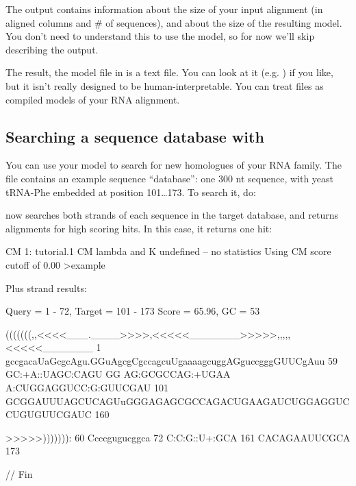 The output  contains information about the size of your
input alignment (in aligned columns and \# of sequences), and about
the size of the resulting model. You don't need to understand this to
use the model, so for now we'll skip describing the output. 

The result, the model file in  is a text file. You can
look at it (e.g. ) if you like, but it isn't really
designed to be human-interpretable. You can treat  files as
compiled models of your RNA alignment.

\newpage
\subsection{Searching a sequence database with }

You can use your model to search for new homologues of your RNA
family. The file  contains an example sequence
``database'': one 300 nt sequence, with yeast tRNA-Phe embedded at
position 101\ldots173. To search it, do:


 now searches both strands of each sequence in the
target database, and returns alignments for high scoring hits.  In
this case, it returns one hit:

\begin{sreoutput}
CM 1: tutorial.1
CM lambda and K undefined -- no statistics
Using CM score cutoff of 0.00
>example

  Plus strand results:

 Query = 1 - 72, Target = 101 - 173
 Score = 65.96, GC =  53

           (((((((,,<<<<___.____>>>>,<<<<<_______>>>>>,,,,,<<<<<_______
         1 gccgacaUaGcgcAgu.GGuAgcgCgccagcuUgaaaagcuggAGguccgggGUUCgAuu 59      
           GC:+A::UAGC:CAGU GG AG:GCGCCAG:+UGAA A:CUGGAGGUCC:G:GUUCGAU 
       101 GCGGAUUUAGCUCAGUuGGGAGAGCGCCAGACUGAAGAUCUGGAGGUCCUGUGUUCGAUC 160     

           >>>>>))))))):
        60 Ccccgugucggca 72      
           C:C:G::U+:GCA
       161 CACAGAAUUCGCA 173     


//
Fin
\end{sreoutput}

